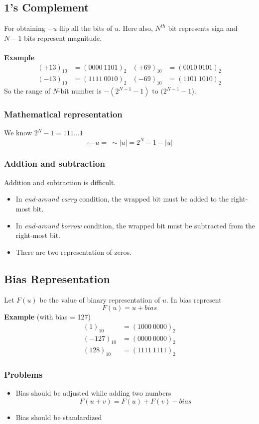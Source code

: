 \documentclass[oneside]{book}
\begin{document}
\subsection{1's Complement}
For obtaining \(-u\) flip all the bits of \(u\). Here also, \(N^{th}\) bit represents sign and \(N-1\) bits represent magnitude.
\\\\ \noindent\textbf{Example}
\begin{align*}
	(+13)_{10} & = (0000\ 1101)_2 & (+69)_{10} & = (0010\ 0101)_2 \\
	(-13)_{10} & = (1111\ 0010)_2 & (-69)_{10} & = (1101\ 1010)_2
\end{align*}
\noindent So the range of \(N\)-bit number is \(-(2^{N-1} - 1)\) to \((2^{N-1} - 1\)).
\subsubsection{Mathematical representation}
We know \(2^{N} - 1 = 111\ldots1\)
\[
	\therefore -u =\ \sim|u| = 2^N - 1 - |u|
\]
\subsubsection{Addtion and subtraction}
\noindent Addition and subtraction is difficult.
\begin{itemize}
	\item In \textit{end-around carry} condition, the wrapped bit must be added to the right-most bit.
	\item In \textit{end-around borrow} condition, the wrapped bit must be subtracted from the right-most bit.
	\item There are two representation of zeros.
\end{itemize}

\subsection{Bias Representation}
Let \(F(u)\) be the value of binary representation of \(u\). In bias represent
\[
	F(u) = u + bias
\]
\noindent\textbf{Example} (with bias = 127)
\begin{align*}
	(1)_{10}    & = (1000\ 0000)_2 \\
	(-127)_{10} & = (0000\ 0000)_2 \\
	(128)_{10}  & = (1111\ 1111)_2
\end{align*}

\subsubsection{Problems}
\begin{itemize}
	\item Bias should be adjusted while adding two numbers
	      \[
		      F(u + v) = F(u) + F(v) - bias
	      \]
	\item Bias should be standardized
\end{itemize}
\end{document}
